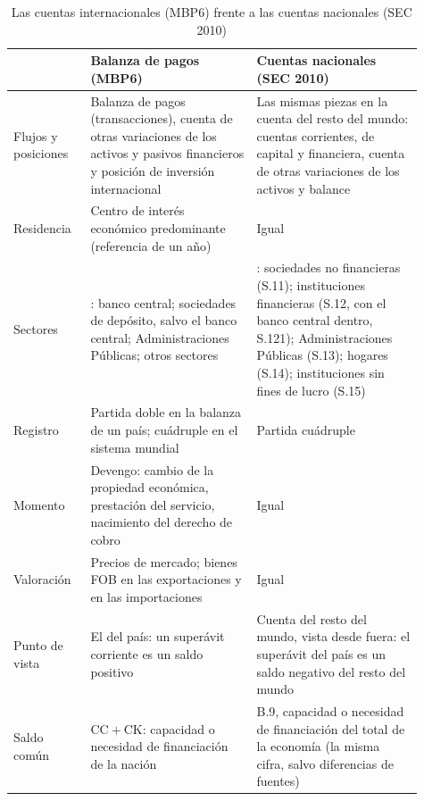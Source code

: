 \documentclass[11pt]{article}
\begin{document}
\begin{table}[H]
\centering
\caption{Las cuentas internacionales (MBP6) frente a las cuentas nacionales (SEC 2010)}\label{tab:mbp6-sec2010}
\renewcommand{\arraystretch}{1.25}
\small
\begin{tabular}{>{\raggedright\arraybackslash}m{0.17\linewidth}>{\raggedright\arraybackslash}m{0.37\linewidth}>{\raggedright\arraybackslash}m{0.37\linewidth}}
\toprule
\rowcolor{tceeazulpalido}
 & \textbf{Balanza de pagos (MBP6)} & \textbf{Cuentas nacionales (SEC 2010)}\\
\midrule
Flujos y posiciones & Balanza de pagos (transacciones), cuenta de otras variaciones de los activos y pasivos financieros y posición de inversión internacional & Las mismas piezas en la cuenta del resto del mundo: cuentas corrientes, de capital y financiera, cuenta de otras variaciones de los activos y balance\\
Residencia & Centro de interés económico predominante (referencia de un año) & Igual\\
Sectores & 4: banco central; sociedades de depósito, salvo el banco central; Administraciones Públicas; otros sectores & 5: sociedades no financieras (S.11); instituciones financieras (S.12, con el banco central dentro, S.121); Administraciones Públicas (S.13); hogares (S.14); instituciones sin fines de lucro (S.15)\\
Registro & Partida doble en la balanza de un país; cuádruple en el sistema mundial & Partida cuádruple\\
Momento & Devengo: cambio de la propiedad económica, prestación del servicio, nacimiento del derecho de cobro & Igual\\
Valoración & Precios de mercado; bienes FOB en las exportaciones y en las importaciones & Igual\\
Punto de vista & El del país: un superávit corriente es un saldo positivo & Cuenta del resto del mundo, vista desde fuera: el superávit del país es un saldo negativo del resto del mundo\\
Saldo común & $\mathrm{CC}+\mathrm{CK}$: capacidad o necesidad de financiación de la nación & B.9, capacidad o necesidad de financiación del total de la economía (la misma cifra, salvo diferencias de fuentes)\\
\bottomrule
\end{tabular}
\end{table}
\end{document}
